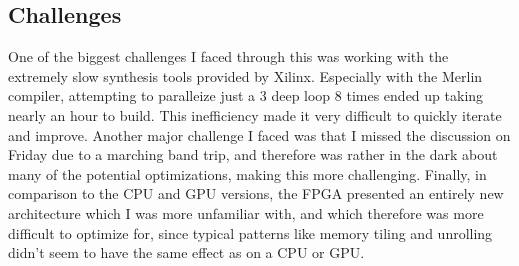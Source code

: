 \documentclass[letterpaper,twocolumn,10pt]{article}
\begin{document}
\subsection{Challenges}
One of the biggest challenges I faced through this was working with the
extremely slow synthesis tools provided by Xilinx. Especially with the Merlin
compiler, attempting to paralleize just a 3 deep loop 8 times ended up taking
nearly an hour to build. This inefficiency made it very difficult to quickly
iterate and improve. Another major challenge I faced was that I missed the
discussion on Friday due to a marching band trip, and therefore was rather in
the dark about many of the potential optimizations, making this more
challenging. Finally, in comparison to the CPU and GPU versions, the FPGA
presented an entirely new architecture which I was more unfamiliar with, and 
which therefore was more difficult to optimize for, since typical patterns like
memory tiling and unrolling didn't seem to have the same effect as on a CPU or
GPU.
\end{document}
